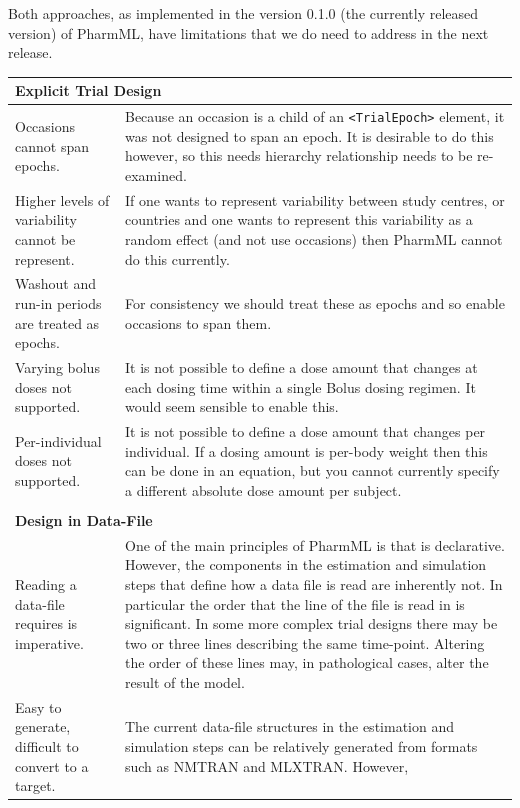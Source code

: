 \documentclass[a4paper,10pt]{article}
\newcommand{\pharmml}{PharmML\xspace}
\newcommand{\xelem}[1]{\texttt{<#1>}\index{XML Element!\texttt{<#1>}}}
\begin{document}
Both approaches, as implemented in the version 0.1.0 (the currently
released version) of \pharmml, have limitations that we do need to
address in the next release.

{\small%
\begin{longtable}{p{5cm} p{10cm}}\toprule
  \multicolumn{2}{l}{\textbf{Explicit Trial Design}}\\\midrule
  Occasions cannot span epochs. & Because an occasion is a child of an
  \xelem{TrialEpoch} element, it was not designed to span an epoch. It
  is desirable to do this however, so this needs hierarchy relationship
  needs to be re-examined.\\
  Higher levels of variability cannot be represent. & If one wants to
  represent variability between study centres, or countries and one
  wants to represent this variability as a random effect (and not use
  occasions) then \pharmml cannot do this currently.\\
  Washout and run-in periods are treated as epochs. & For consistency we
  should treat these as epochs and so enable occasions to span them.\\
  Varying bolus doses not supported. & It is not possible to define a
  dose amount that changes at each dosing time within a single Bolus
  dosing regimen. It would seem sensible to enable this.\\
  Per-individual doses not supported. & It is not possible to define a
  dose amount that changes per individual. If a dosing amount is
  per-body weight then this can be done in an equation, but you cannot
  currently specify a different absolute dose amount per subject.\\\\
  \multicolumn{2}{l}{\textbf{Design in Data-File}}\\\midrule
  Reading a data-file requires is imperative. & One of the main
  principles of \pharmml is that is declarative. However, the components
  in the estimation and simulation steps that define how a data file is
  read are inherently not. In particular the order that the line of the file
  is read in is significant. In some more complex trial designs there
  may be two or three lines describing the same time-point. Altering the
  order of these lines may, in pathological cases,  alter the result of
  the model.\\
  Easy to generate, difficult to convert to a target. & The current
  data-file structures in the estimation and simulation steps can be
  relatively generated from formats such as NMTRAN and MLXTRAN. However,

\end{longtable}}
\end{document}
